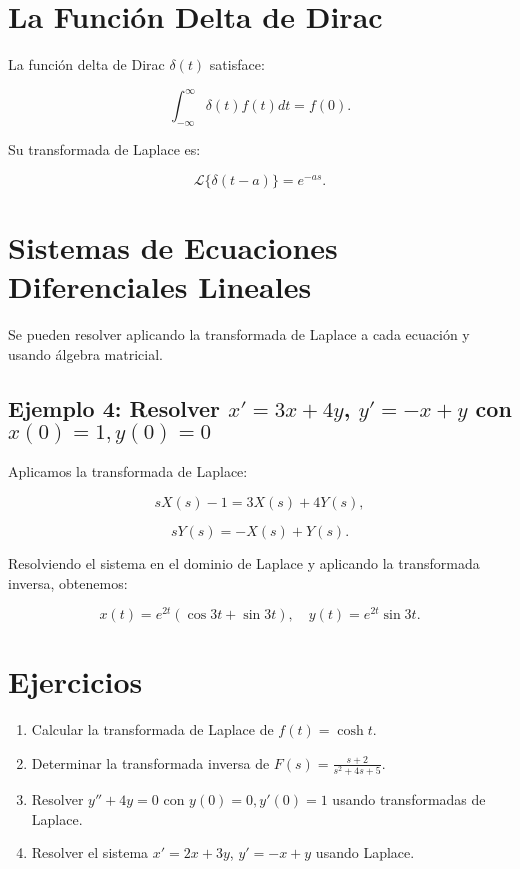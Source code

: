 \section{La Función Delta de Dirac}
La función delta de Dirac \( \delta(t) \) satisface:

\begin{equation}
\int_{-\infty}^{\infty} \delta(t) f(t) dt = f(0).
\end{equation}

Su transformada de Laplace es:

\begin{equation}
\mathcal{L} \{ \delta(t - a) \} = e^{-as}.
\end{equation}

\section{Sistemas de Ecuaciones Diferenciales Lineales}
Se pueden resolver aplicando la transformada de Laplace a cada ecuación y usando álgebra matricial.

\subsection*{Ejemplo 4: Resolver \( x' = 3x + 4y \), \( y' = -x + y \) con \( x(0) = 1, y(0) = 0 \)}
Aplicamos la transformada de Laplace:

\begin{equation}
sX(s) - 1 = 3X(s) + 4Y(s),
\end{equation}

\begin{equation}
sY(s) = -X(s) + Y(s).
\end{equation}

Resolviendo el sistema en el dominio de Laplace y aplicando la transformada inversa, obtenemos:

\begin{equation}
x(t) = e^{2t} ( \cos 3t + \sin 3t), \quad y(t) = e^{2t} \sin 3t.
\end{equation}

\section{Ejercicios}
\begin{enumerate}
    \item Calcular la transformada de Laplace de \( f(t) = \cosh t \).
    \item Determinar la transformada inversa de \( F(s) = \frac{s+2}{s^2 + 4s + 5} \).
    \item Resolver \( y'' + 4y = 0 \) con \( y(0) = 0, y'(0) = 1 \) usando transformadas de Laplace.
    \item Resolver el sistema \( x' = 2x + 3y \), \( y' = -x + y \) usando Laplace.
\end{enumerate}

